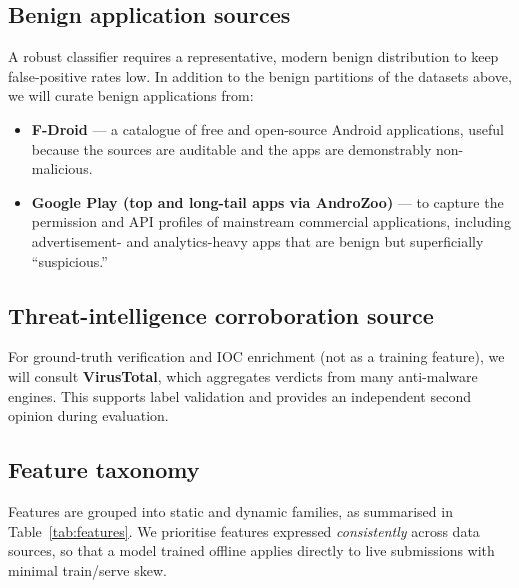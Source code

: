 \documentclass[11pt,a4paper]{article}
\newcommand{\dsname}[1]{\textbf{#1}}
\begin{document}
\subsection{Benign application sources}
A robust classifier requires a representative, modern benign distribution to keep
false-positive rates low. In addition to the benign partitions of the datasets above, we
will curate benign applications from:
\begin{itemize}
    \item \dsname{F-Droid} --- a catalogue of free and open-source Android applications, useful because the sources are auditable and the apps are demonstrably non-malicious.
    \item \dsname{Google Play (top and long-tail apps via AndroZoo)} --- to capture the permission and API profiles of mainstream commercial applications, including advertisement- and analytics-heavy apps that are benign but superficially ``suspicious.''
\end{itemize}

\subsection{Threat-intelligence corroboration source}
For ground-truth verification and IOC enrichment (not as a training feature), we will
consult \dsname{VirusTotal}, which aggregates verdicts from many anti-malware engines.
This supports label validation and provides an independent second opinion during
evaluation.

\subsection{Feature taxonomy}
Features are grouped into static and dynamic families, as summarised in
Table~\ref{tab:features}. We prioritise features expressed \emph{consistently} across data
sources, so that a model trained offline applies directly to live submissions with minimal
train/serve skew.
\end{document}
